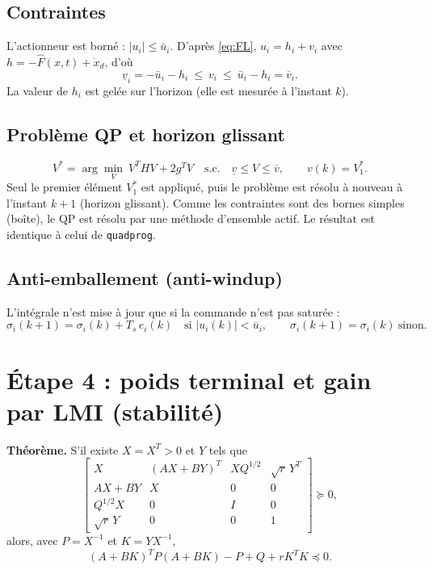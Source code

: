 \documentclass[11pt,a4paper]{article}
\begin{document}
\subsection{Contraintes}
L'actionneur est borné : $|u_i|\le\bar u_i$. D'après \eqref{eq:FL}, $u_i=h_i+v_i$ avec $h=-\hat F(x,t)+\dot x_d$, d'où
\begin{equation}
\underline v_i=-\bar u_i-h_i\ \le\ v_i\ \le\ \bar u_i-h_i=\overline v_i .
\label{eq:contraintes}
\end{equation}
La valeur de $h_i$ est gelée sur l'horizon (elle est mesurée à l'instant $k$).

\subsection{Problème QP et horizon glissant}
\begin{equation}
\boxed{V^\ast=\arg\min_V\ V^THV+2g^TV\quad\text{s.c.}\quad \underline v\le V\le\overline v},\qquad v(k)=V^\ast_1 .
\label{eq:qp}
\end{equation}
Seul le premier élément $V^\ast_1$ est appliqué, puis le problème est résolu à nouveau à l'instant $k+1$ (horizon glissant). Comme les contraintes sont des bornes simples (boîte), le QP est résolu par une méthode d'ensemble actif. Le résultat est identique à celui de \texttt{quadprog}.

\subsection{Anti-emballement (anti-windup)}
L'intégrale n'est mise à jour que si la commande n'est pas saturée :
\[
\sigma_i(k+1)=\sigma_i(k)+T_s\,e_i(k)\quad\text{si } |u_i(k)|<\bar u_i,\qquad \sigma_i(k+1)=\sigma_i(k)\ \text{sinon}.
\]

\section{Étape 4 : poids terminal et gain par LMI (stabilité)}\label{sec:lmi}

\textbf{Théorème.} S'il existe $X=X^T>0$ et $Y$ tels que
\begin{equation}
\begin{bmatrix}
X & (AX+BY)^T & XQ^{1/2} & \sqrt r\,Y^T\\
AX+BY & X & 0 & 0\\
Q^{1/2}X & 0 & I & 0\\
\sqrt r\,Y & 0 & 0 & 1
\end{bmatrix}\succeq0,
\label{eq:lmi}
\end{equation}
alors, avec $P=X^{-1}$ et $K=YX^{-1}$,
\begin{equation}
(A+BK)^TP(A+BK)-P+Q+rK^TK\preceq0 .
\label{eq:lyap}
\end{equation}
\end{document}
